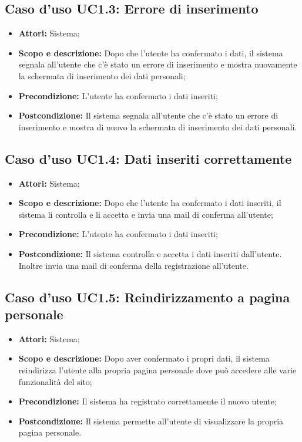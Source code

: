 \subsection{Caso d'uso UC1.3: Errore di inserimento}
\begin{itemize}
	\item \textbf{Attori:} Sistema;
	\item \textbf{Scopo e descrizione:} Dopo che l'utente ha confermato i dati, il sistema segnala all'utente che c'è stato un errore di inserimento e mostra nuovamente la schermata di inserimento dei dati personali;
	\item \textbf{Precondizione:} L'utente ha confermato i dati inseriti;
	\item \textbf{Postcondizione:} Il sistema segnala all'utente che c'è stato un errore di inserimento e mostra di nuovo la schermata di inserimento dei dati personali.
\end{itemize}

\subsection{Caso d'uso UC1.4: Dati inseriti correttamente}
\begin{itemize}
	\item \textbf{Attori:} Sistema;
	\item \textbf{Scopo e descrizione:} Dopo che l'utente ha confermato i dati inseriti, il sistema li controlla e li accetta e invia una mail di conferma all'utente;
	\item \textbf{Precondizione:} L'utente ha confermato i dati inseriti;
	\item \textbf{Postcondizione:} Il sistema controlla e accetta i dati inseriti dall'utente. Inoltre invia una mail di conferma della registrazione all'utente.
\end{itemize}

\subsection{Caso d'uso UC1.5: Reindirizzamento a pagina personale}
\begin{itemize}
	\item \textbf{Attori:} Sistema;
	\item \textbf{Scopo e descrizione:} Dopo aver confermato i propri dati, il sistema reindirizza l'utente alla propria pagina personale dove può accedere alle varie funzionalità del sito;
	\item \textbf{Precondizione:} Il sistema ha registrato correttamente il nuovo utente;
	\item \textbf{Postcondizione:} Il sistema permette all'utente di visualizzare la propria pagina personale.
\end{itemize}